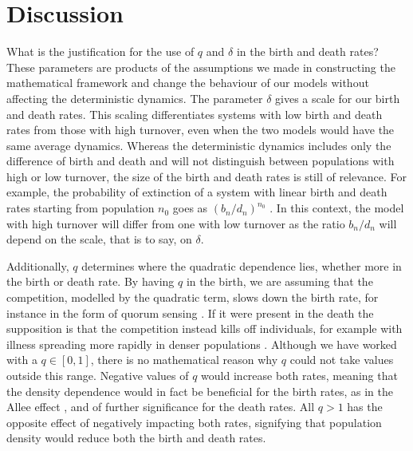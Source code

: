 
\section{Discussion}

What is the justification for the use of $q$ and $\delta$ in the birth and death rates? 
These parameters are products of the assumptions we made in constructing the mathematical framework and change the behaviour of our models without affecting the deterministic dynamics.
The parameter $\delta$ gives a scale for our birth and death rates.
This scaling differentiates systems with low birth and death rates from those with high turnover, even when the two models would have the same average dynamics. 
Whereas the deterministic dynamics includes only the difference of birth and death and will not distinguish between populations with high or low turnover, the size of the birth and death rates is still of relevance. 
For example, the probability of extinction of a system with linear birth and death rates starting from population $n_0$ goes as $(b_n/d_n)^{n_0}$ \cite{Nisbet1982}.
In this context, the model with high turnover will differ from one with low turnover as the ratio $b_n/d_n$ will depend on the scale, that is to say, on $\delta$. 

Additionally, $q$ determines where the quadratic dependence lies, whether more in the birth or death rate. 
By having $q$ in the birth, we are assuming that the competition, modelled by the quadratic term, slows down the birth rate, for instance in the form of quorum sensing \cite{Nadell2008}. %
If it were present in the death the supposition is that the competition instead kills off individuals, for example with illness spreading more rapidly in denser populations \cite{}.
Although we have worked with a $q \in [0,1]$, there is no mathematical reason why $q$ could not take values outside this range. 
Negative values of $q$ would increase both rates, meaning that the density dependence would in fact be beneficial for the birth rates, as in the Allee effect \cite{}, and of further significance for the death rates. 
All $q>1$ has the opposite effect of negatively impacting both rates, signifying that population density would reduce both the birth and death rates. %

